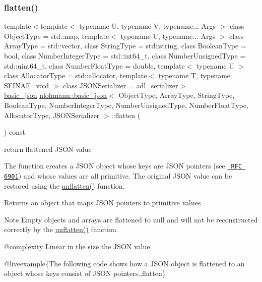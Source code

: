 \subsubsection{\texorpdfstring{flatten()}{flatten()}}
{\footnotesize\ttfamily template$<$template$<$ typename U, typename V, typename... Args $>$ class Object\+Type = std\+::map, template$<$ typename U, typename... Args $>$ class Array\+Type = std\+::vector, class String\+Type  = std\+::string, class Boolean\+Type  = bool, class Number\+Integer\+Type  = std\+::int64\+\_\+t, class Number\+Unsigned\+Type  = std\+::uint64\+\_\+t, class Number\+Float\+Type  = double, template$<$ typename U $>$ class Allocator\+Type = std\+::allocator, template$<$ typename T, typename S\+F\+I\+N\+A\+E=void $>$ class J\+S\+O\+N\+Serializer = adl\+\_\+serializer$>$ \\
\mbox{\hyperlink{classnlohmann_1_1basic__json}{basic\+\_\+json}} \mbox{\hyperlink{classnlohmann_1_1basic__json}{nlohmann\+::basic\+\_\+json}}$<$ Object\+Type, Array\+Type, String\+Type, Boolean\+Type, Number\+Integer\+Type, Number\+Unsigned\+Type, Number\+Float\+Type, Allocator\+Type, J\+S\+O\+N\+Serializer $>$\+::flatten (\begin{DoxyParamCaption}{ }\end{DoxyParamCaption}) const\hspace{0.3cm}{\ttfamily [inline]}}



return flattened J\+S\+ON value 

The function creates a J\+S\+ON object whose keys are J\+S\+ON pointers (see \href{https://tools.ietf.org/html/rfc6901}{\texttt{ R\+FC 6901}}) and whose values are all primitive. The original J\+S\+ON value can be restored using the \mbox{\hyperlink{classnlohmann_1_1basic__json_a74fa3ab2003f2f6f2b69deaafed9126d}{unflatten()}} function.

\begin{DoxyReturn}{Returns}
an object that maps J\+S\+ON pointers to primitive values
\end{DoxyReturn}
\begin{DoxyNote}{Note}
Empty objects and arrays are flattened to {\ttfamily null} and will not be reconstructed correctly by the \mbox{\hyperlink{classnlohmann_1_1basic__json_a74fa3ab2003f2f6f2b69deaafed9126d}{unflatten()}} function.
\end{DoxyNote}
@complexity Linear in the size the J\+S\+ON value.

@liveexample\{The following code shows how a J\+S\+ON object is flattened to an object whose keys consist of J\+S\+ON pointers.,flatten\}

